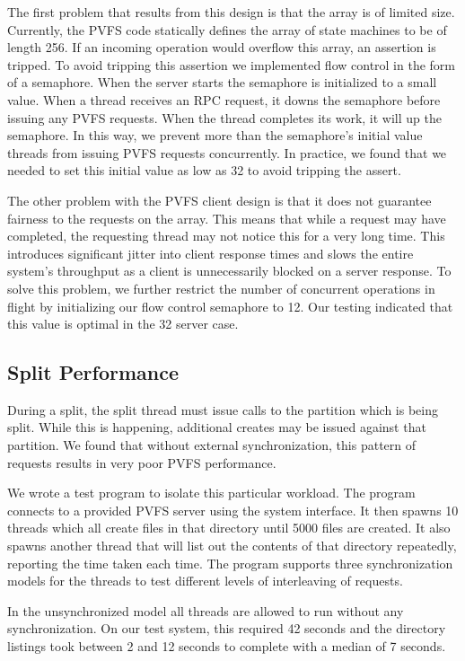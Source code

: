 \documentclass[onecolumn, 11pt, letterpaper]{article}
\begin{document}
The first problem that results from this design is that the array is of
limited size.  Currently, the PVFS code statically defines the array of state
machines to be of length 256.  If an incoming operation would overflow this
array, an assertion is tripped.  To avoid tripping this assertion we
implemented flow control in the form of a semaphore.  When the server starts
the semaphore is initialized to a small value.  When a thread receives an RPC
request, it downs the semaphore before issuing any PVFS requests.  When the
thread completes its work, it will up the semaphore.  In this way, we prevent
more than the semaphore's initial value threads from issuing PVFS requests
concurrently.  In practice, we found that we needed to set this initial value
as low as 32 to avoid tripping the assert.

The other problem with the PVFS client design is that it does not guarantee fairness to
the requests on the array.  This means that while a request may have
completed, the requesting thread may not notice this for a very long time.
This introduces significant jitter into client response times and slows the
entire system's throughput as a client is unnecessarily blocked on a server
response.  To solve this problem, we further restrict the number of concurrent
operations in flight by initializing our flow control semaphore to 12.
Our testing indicated that this value is optimal in the 32 server case.

\subsection{Split Performance}
\label{section:splitperf}
During a split, the split thread must issue  calls to the
partition which is being split.  While this is happening, additional creates
may be issued against that partition.  We found that without external
synchronization, this pattern of requests results in very poor PVFS
performance.

We wrote a test program to isolate this particular workload.  The program
connects to a provided PVFS server using the system interface.  It then spawns
10 threads which all create files in that directory until 5000 files are
created.  It also spawns another thread that will list out the contents of
that directory repeatedly, reporting the time taken each time.  The program
supports three synchronization models for the threads to test different levels
of interleaving of requests.

In the unsynchronized model all threads are allowed to run without any
synchronization.  On our test system, this required 42 seconds and the
directory listings took between 2 and 12 seconds to complete with a median of
7 seconds.
\end{document}
